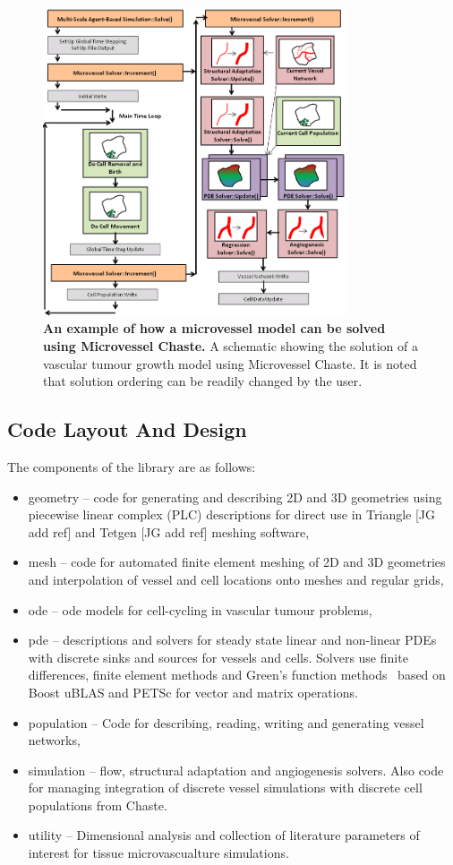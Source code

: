 \documentclass[10pt,letterpaper]{article}
\begin{document}
\begin{figure}[!h]
\centering
\includegraphics[width=0.8\textwidth]{Fig2.png}
\caption{{\bf An example of how a microvessel model can be solved using Microvessel Chaste.}
A schematic showing the solution of a vascular tumour growth model using Microvessel Chaste. It is noted that solution ordering can be readily changed by the user.}
\label{fig2}
\end{figure}

\subsection*{Code Layout And Design}

The components of the library are as follows:

\begin{itemize}
	\item geometry -- code for generating and describing 2D and 3D geometries using piecewise linear complex (PLC) descriptions for direct use in Triangle [JG add ref] and Tetgen [JG add ref] meshing software,
	\item mesh -- code for automated finite element meshing of 2D and 3D geometries and interpolation of vessel and cell locations onto meshes and regular grids,
	\item ode -- ode models for cell-cycling in vascular tumour problems,
	\item pde -- descriptions and solvers for steady state linear and non-linear PDEs with discrete sinks and sources for vessels and cells. Solvers use finite differences, finite element methods and Green's function methods~\cite{Secomb2013} based on Boost uBLAS and PETSc for vector and matrix operations.
	\item population -- Code for describing, reading, writing and generating vessel networks,
	\item simulation -- flow, structural adaptation and angiogenesis solvers. Also code for managing integration of discrete vessel simulations with discrete cell populations from Chaste.
	\item utility -- Dimensional analysis and collection of literature parameters of interest for tissue microvascualture simulations.	
\end{itemize}
\end{document}
